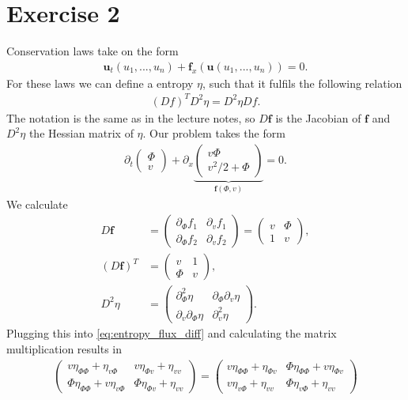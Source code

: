 \section{Exercise 2}
Conservation laws take on the form
\begin{align}
\bm u_t(u_1,...,u_n) + \bm f_x(\bm u(u_1,...,u_n)) = 0.
\end{align}
For these laws we can define a entropy $\eta$, such that it fulfils the following relation
\begin{align}
(Df)^T D^2\eta = D^2\eta Df.\label{eq:entropy_flux_diff}
\end{align}
The notation is the same as in the lecture notes, so $D \bm f$ is the Jacobian of $\bm f$ and $D^2 \eta$ the Hessian matrix of $\eta$.
Our problem takes the form
\begin{align}
\partial_t
\begin{pmatrix} 
\Phi\\
v 
\end{pmatrix} +
\partial_x
\underbrace{
\begin{pmatrix} 
v\Phi\\
v^2/2 + \Phi
\end{pmatrix}}_{\bm f(\Phi, v)} = 0.
\end{align}
We calculate
\begin{align}
D\bm f &= \begin{pmatrix} \partial_\Phi f_1 & \partial_v f_1 \\ \partial_\Phi f_2 & \partial_v f_2\end{pmatrix} =  \begin{pmatrix} v & \Phi \\ 1 & v\end{pmatrix},\\
(D\bm f)^T &= \begin{pmatrix} v & 1 \\ \Phi & v\end{pmatrix},\\
D^2\eta &= \begin{pmatrix}\partial^2_\Phi \eta & \partial_\Phi\partial_v \eta\\ \partial_v \partial_\Phi\eta&\partial^2_v \eta \end{pmatrix}.
\end{align}
Plugging this into \cref{eq:entropy_flux_diff} and calculating the matrix multiplication results in
\begin{align}
\begin{pmatrix}
v\eta_{\Phi\Phi} +\eta_{v \Phi} & v\eta_{\Phi v} +\eta_{vv} \\
\Phi \eta_{\Phi\Phi} + v\eta_{v\Phi} & \Phi\eta_{\Phi v}+\eta_{v v}
\end{pmatrix}
=
\begin{pmatrix}
v\eta_{\Phi\Phi} +\eta_{\Phi v} & \Phi\eta_{\Phi\Phi} + v\eta_{\Phi v}\\
v \eta_{v\Phi} + \eta_{v v} & \Phi\eta_{ v \Phi}+\eta_{v v}
\end{pmatrix}
\end{align}
